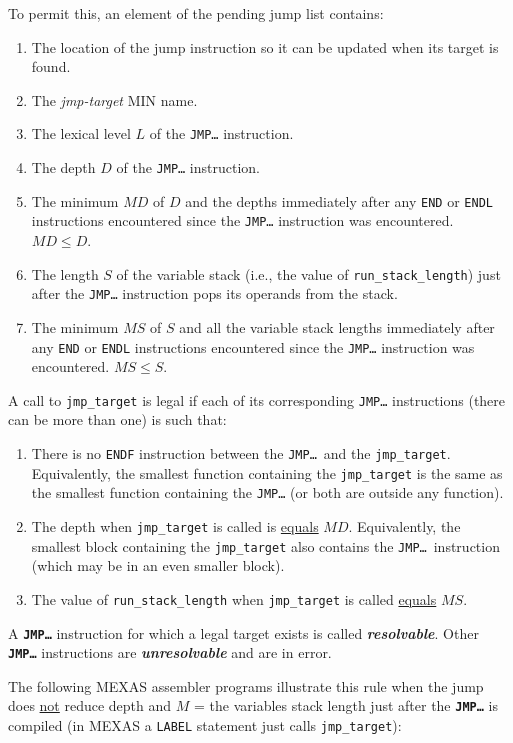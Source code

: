 \documentclass[12pt]{article}
\newcommand{\TT}[1]{{\tt \bfseries #1}}
\newcommand{\key}[1]{{\bf \em #1}\index{#1}}
\begin{document}
To permit this, an element of the pending jump list contains:
\begin{enumerate}
\item The location of the jump instruction so it can be updated
when its target is found.
\item The {\em jmp-target} MIN name.
\item The lexical level $L$ of the {\tt JMP\ldots} instruction.
\item The depth $D$ of the {\tt JMP\ldots} instruction.
\item The minimum $MD$ of $D$ and
      the depths immediately after any {\tt END} or {\tt ENDL} instructions
      encountered since the {\tt JMP\ldots} instruction was encountered.
      $MD\le D$.
\item The length $S$ of the variable stack (i.e., the value of
      {\tt run\_stack\_length}) just after the {\tt JMP\ldots}
      instruction pops its operands from the stack.
\item The minimum $MS$ of $S$ and all the variable stack lengths immediately
      after any {\tt END} or {\tt ENDL} instructions encountered
      since the {\tt JMP\ldots} instruction was encountered.
      $MS\le S$.
\end{enumerate}

A call to {\tt jmp\_target} is legal if each of its
corresponding {\tt JMP\ldots} instructions (there can be more than one)
is such that:
\begin{enumerate}
\item
There is no {\tt ENDF} instruction between the
{\tt JMP\ldots}~and the {\tt jmp\_target}.
Equivalently, the smallest function containing the {\tt jmp\_target}
is the same as the smallest function containing the {\tt JMP\ldots}
(or both are outside any function).
\item The depth when {\tt jmp\_target} is called is \underline{equals} $MD$.
Equivalently, the smallest block containing the {\tt jmp\_target}
also contains the {\tt JMP\ldots}~instruction (which may be in an even
smaller block).
\item The value of {\tt run\_stack\_length} when {\tt jmp\_target}
is called \underline{equals} $MS$.
\end{enumerate}

A \TT{JMP\ldots} instruction for which a legal target exists
is called \key{resolvable}.  Other \TT{JMP\ldots} instructions
are \key{unresolvable} and are in error.

The following MEXAS assembler programs illustrate this
rule when the jump does \underline{not}
reduce depth and $M$ = the variables stack length just after the
\TT{JMP\ldots} is compiled (in MEXAS a {\tt LABEL} statement
just calls {\tt jmp\_target}):
\end{document}
